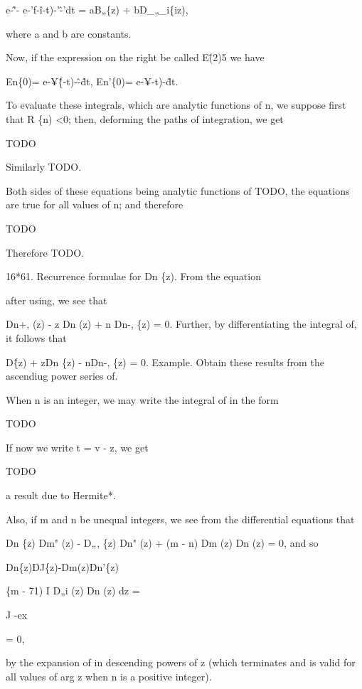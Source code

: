 e-\^'- e-'f-\^i-t)-'\^-'dt = aB„\{z) + bD\_„\_i\{iz),

where a and b are constants.

Now, if the expression on the right be called E\^ (2)5 we have

En\{0)= e-¥\^\{-t)-\^-\^dt, En'\{0)= e-¥-t)-\^dt.

To evaluate these integrals, which are analytic functions of n, we
suppose first that R \{n) <0; then, deforming the paths of
integration, we get

TODO

Similarly TODO.

Both sides of these equations being analytic functions of TODO, the
equations are true for all values of n; and therefore

TODO

Therefore TODO.

%
%

16*61. Recurrence formulae for Dn \{z). From the equation

after using, we see that

Dn+, (z) - z Dn (z) + n Dn-, \{z) = 0. Further, by differentiating the
integral of, it follows that

D\^ \{z) + zDn \{z) - nDn-, \{z) = 0. Example. Obtain these results
from the ascendiug power series of.


When n is an integer, we may write the integral of in the form

TODO

If now we write t = v - z, we get

TODO

a result due to Hermite*.

Also, if m and n be unequal integers, we see from the differential
equations that

Dn \{z) Dm" (z) - D„, \{z) Dn" (z) + (m - n) Dm (z) Dn (z) = 0, and so

Dn\{z)DJ\{z)-Dm(z)Dn'\{z)

\{m - 71) I D„i (z) Dn (z) dz =

J -ex

= 0,

by the expansion of in descending powers of z (which terminates
and is valid for all values of arg z when n is a positive integer).

